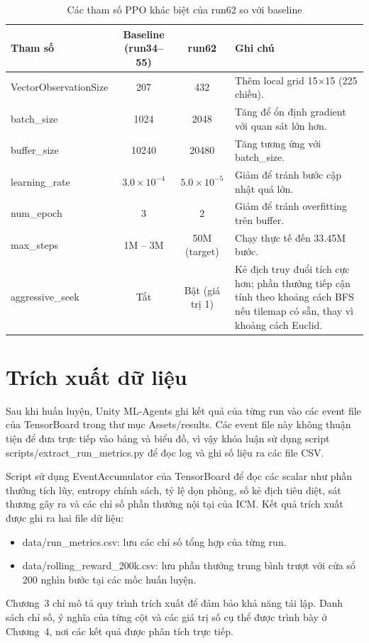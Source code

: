 \begin{table}[H]
    \centering
    \small
    \caption{Các tham số PPO khác biệt của run62 so với baseline}
    \label{tab:run62_ppo_config}
    \begin{tabular}{|p{4cm}|c|c|p{5cm}|}
        \hline
        \textbf{Tham số} & \textbf{Baseline (run34--55)} & \textbf{run62} & \textbf{Ghi chú} \\
        \hline
        VectorObservationSize & 207 & 432 & Thêm local grid 15$\times$15 (225 chiều). \\
        \hline
        batch\_size & 1024 & 2048 & Tăng để ổn định gradient với quan sát lớn hơn. \\
        \hline
        buffer\_size & 10240 & 20480 & Tăng tương ứng với batch\_size. \\
        \hline
        learning\_rate & $3.0 \times 10^{-4}$ & $5.0 \times 10^{-5}$ & Giảm để tránh bước cập nhật quá lớn. \\
        \hline
        num\_epoch & 3 & 2 & Giảm để tránh overfitting trên buffer. \\
        \hline
        max\_steps & 1M -- 3M & 50M (target) & Chạy thực tế đến 33.45M bước. \\
        \hline
        aggressive\_seek & Tắt & Bật (giá trị 1) & Kẻ địch truy đuổi tích cực hơn; phần thưởng tiếp cận tính theo khoảng cách BFS nếu tilemap có sẵn, thay vì khoảng cách Euclid. \\
        \hline
    \end{tabular}
\end{table}

\section{Trích xuất dữ liệu}

Sau khi huấn luyện, Unity ML-Agents ghi kết quả của từng run vào các event file của TensorBoard trong thư mục Assets/results. Các event file này không thuận tiện để đưa trực tiếp vào bảng và biểu đồ, vì vậy khóa luận sử dụng script scripts/extract\_run\_metrics.py để đọc log và ghi số liệu ra các file CSV.

Script sử dụng EventAccumulator của TensorBoard để đọc các scalar như phần thưởng tích lũy, entropy chính sách, tỷ lệ dọn phòng, số kẻ địch tiêu diệt, sát thương gây ra và các chỉ số phần thưởng nội tại của ICM. Kết quả trích xuất được ghi ra hai file dữ liệu:

\begin{itemize}
    \item data/run\_metrics.csv: lưu các chỉ số tổng hợp của từng run.
    \item data/rolling\_reward\_200k.csv: lưu phần thưởng trung bình trượt với cửa sổ 200 nghìn bước tại các mốc huấn luyện.
\end{itemize}

Chương~3 chỉ mô tả quy trình trích xuất để đảm bảo khả năng tái lập. Danh sách chỉ số, ý nghĩa của từng cột và các giá trị số cụ thể được trình bày ở Chương~4, nơi các kết quả được phân tích trực tiếp.
